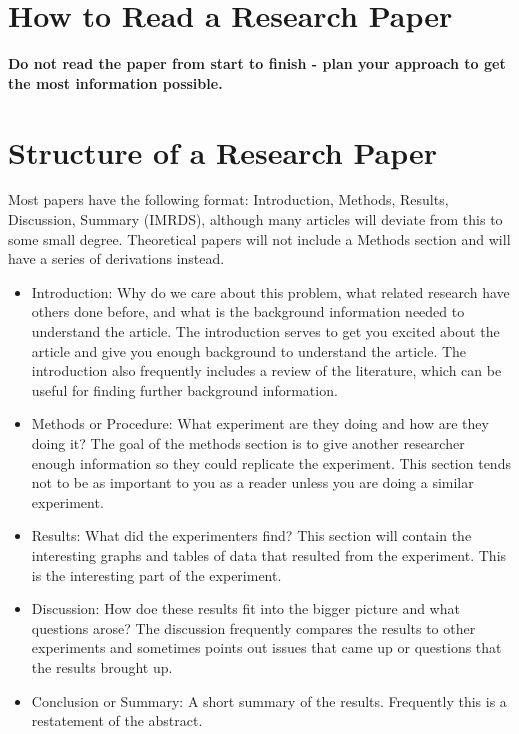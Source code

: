 \documentclass[12pt, letterpaper]{article}
\begin{document}
\section*{How to Read a Research Paper}


\textbf{Do not read the paper from start to finish - plan your approach to get the most information possible.}

\section*{Structure of a Research Paper}

Most papers have the following format: Introduction, Methods, Results, Discussion, Summary (IMRDS), although many articles will deviate from this to some small degree.  Theoretical papers will not include a Methods section and will have a series of derivations instead.

\begin{itemize}

  \item Introduction:  Why do we care about this problem, what related research have others done before, and what is the background information needed to understand the article.  The introduction serves to get you excited about the article and give you enough background to understand the article.  The introduction also frequently includes a review of the literature, which can be useful for finding further background information.

  \item Methods or Procedure: What experiment are they doing and how are they doing it?  The goal of the methods section is to give another researcher enough information so they could replicate the experiment.  This section tends not to be as important to you as a reader unless you are doing a similar experiment.

  \item Results:  What did the experimenters find?  This section will contain the interesting graphs and tables of data that resulted from the experiment.  This is the interesting part of the experiment.

  \item Discussion:  How doe these results fit into the bigger picture and what questions arose?  The discussion frequently compares the results to other experiments and sometimes points out issues that came up or questions that the results brought up.

  \item Conclusion or Summary: A short summary of the results.  Frequently this is a restatement of the abstract.
\end{itemize}
\end{document}
